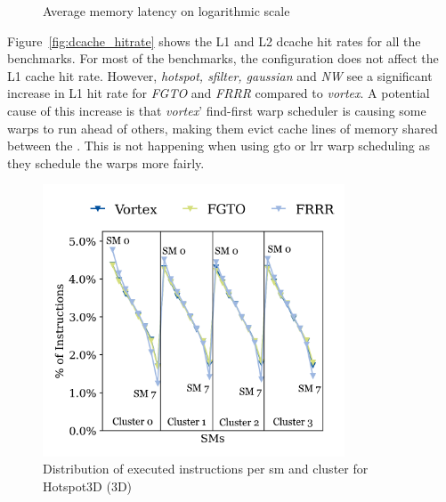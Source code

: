 \begin{figure}
    \centering
    \caption{Average memory latency on logarithmic scale}
    \label{fig:avg_mem_latency}
\end{figure}

Figure~\ref{fig:dcache_hitrate} shows the L1 and L2 dcache hit rates for all the benchmarks. For most of the benchmarks, the configuration does not affect the L1 cache hit rate. However, \textit{hotspot, sfilter, gaussian} and \textit{NW} see a significant increase in L1 hit rate for \textit{FGTO} and \textit{FRRR} compared to \textit{\Gls{vortex}}. A potential cause of this increase is that \textit{\Gls{vortex}}' find-first warp scheduler is causing some warps to run ahead of others, making them evict cache lines of memory shared between the . This is not happening when using \acrshort{gto} or \acrshort{lrr} warp scheduling as they schedule the warps more fairly.

\begin{figure}
    \centering
    \includegraphics[width=0.8\textwidth]{figures/instruction_distribution/hotspot3D_unsorted_numbered.png}
    \caption[Distribution of executed instructions in clusters for Hotspot3D]{Distribution of executed instructions per \acrshort{sm} and cluster for Hotspot3D (3D)}
    \label{fig:instruction_distribution_unsorted_3D}
\end{figure}

